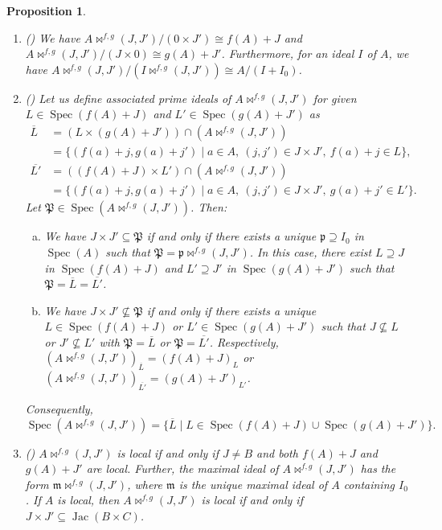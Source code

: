 \documentclass{amsart}%
\theoremstyle{plain}
\newtheorem{proposition}{Proposition}[section]
\numberwithin{equation}{section}
\theoremstyle{definition}
\DeclareMathOperator{\jac}{Jac}
\DeclareMathOperator{\spec}{Spec}
\begin{document}
\begin{proposition} \label{Prop.introd.}
\begin{enumerate}[(1)]
    \item (\cite[Proposition 4.1]{KLT}) \label{isomlemma}
    We have $A\bowtie^{f,g}(J,J')/(0\times J')\cong f(A)+J$ and $A\bowtie^{f,g}(J,J')/(J\times 0)\cong g(A)+J'$. Furthermore, for an ideal $I$ of $A$, we have $A\bowtie^{f,g}(J,J')/(I\bowtie^{f,g}(J,J'))\cong A/(I+I_0)$. 
    
    \item (\cite[Proposition 5.3]{KLT}) \label{primelemma}
    Let us define associated prime ideals of $A\bowtie^{f,g}(J,J')$ for given $L\in\spec(f(A)+J)$ and $L'\in \spec(g(A)+J')$ as
    \begin{align*}
        \overline{L} &= (L\times(g(A)+J'))\cap\left(A\bowtie^{f,g} (J,J')\right) \\
        &= \{(f(a)+j,g(a)+j') \mid a\in A,\ (j,j')\in J\times J',\ f(a)+j\in L\}, \\
        \overline{L'} &= ((f(A)+J)\times L')\cap\left(A\bowtie^{f,g}(J,J')\right) \\
        &= \{(f(a)+j,g(a)+j') \mid a\in A,\ (j,j')\in J\times J',\ g(a)+j'\in L'\}.
    \end{align*}
    Let $\mathfrak{P}\in \spec\left(A\bowtie^{f,g}(J,J')\right)$. Then:
    \begin{enumerate}[(a)]
        \item We have $J\times J'\subseteq \mathfrak{P}$ if and only if there exists a unique $\mathfrak{p}\supseteq I_0$ in $\spec(A)$ such that $\mathfrak{P}=\mathfrak{p}\bowtie^{f,g}(J,J')$. In this case, there exist $L\supseteq J$ in $\spec(f(A)+J)$ and $L'\supseteq J'$ in $\spec(g(A)+J')$ such that $\mathfrak{P}=\overline{L}=\overline{L'}$.
        
        \item We have $J\times J'\nsubseteq \mathfrak{P}$ if and only if there exists a unique $L\in\spec(f(A)+J)$ or $L'\in\spec(g(A)+J')$ such that $J\nsubseteq L$ or $J'\nsubseteq L'$ with $\mathfrak{P}=\overline{L}$ or $\mathfrak{P}=\overline{L'}$. Respectively, $\left(A\bowtie^{f,g}(J,J')\right)_{\overline{L}}=(f(A)+J)_{L}$ or $\left(A\bowtie^{f,g}(J,J')\right)_{\overline{L'}}=(g(A)+J')_{L'}$.
    \end{enumerate}    
    Consequently,
    \[
    \spec\left(A\bowtie^{f,g}(J,J')\right)=\{\overline{L} \mid L\in \spec(f(A)+J)\cup\spec(g(A)+J')\}.
    \]
    
    \item (\cite[Proposition 5.4]{KLT}) \label{locallemma}
    $A\bowtie^{f,g}(J,J')$ is local if and only if $J\neq B$ and both $f(A)+J$ and $g(A)+J'$ are local. Further, the maximal ideal of $A\bowtie^{f,g}(J,J')$ has the form $\mathfrak{m}\bowtie^{f,g}(J,J')$, where $\mathfrak{m}$ is the unique maximal ideal of $A$ containing $I_0$. If $A$ is local, then $A\bowtie^{f,g}(J,J')$ is local if and only if $J \times J'\subseteq\jac(B\times C)$.
\end{enumerate}
\end{proposition}
\end{document}

